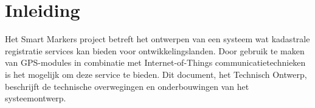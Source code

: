 \section{Inleiding}
Het Smart Markers project betreft het ontwerpen van een systeem wat kadastrale registratie services kan bieden voor ontwikkelingslanden. Door gebruik te maken van GPS-modules in combinatie met Internet-of-Things communicatietechnieken is het mogelijk om deze service te bieden. Dit document, het Technisch Ontwerp, beschrijft de technische overwegingen en onderbouwingen van het systeemontwerp.
